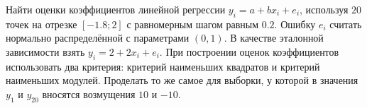 \documentclass[../body.tex]{subfiles}
\begin{document}
	Найти оценки коэффициентов линейной регрессии $y_{i} = a + bx_{i} + e_{i}$, используя $20$ точек на отрезке $[-1.8; 2]$ с равномерным шагом равным $0.2$. Ошибку $e_{i}$ считать нормально распределённой с параметрами $(0, 1)$. В качестве эталонной зависимости взять $y_{i} = 2 + 2x_{i} + e_{i}$. При построении оценок коэффициентов использовать два критерия: критерий наименьших квадратов и критерий наименьших модулей. Проделать то же самое для выборки, у которой в значения $y_{1}$ и $y_{20}$ вносятся возмущения $10$ и $-10$.
	
\end{document}
